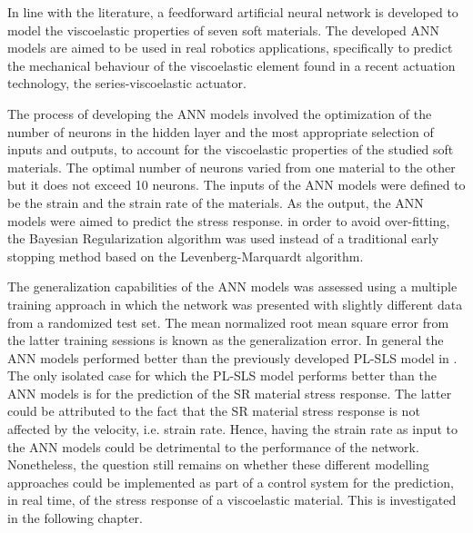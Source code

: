 In line with the literature, a feedforward artificial neural network is developed to model the viscoelastic properties of seven soft materials. The developed ANN models are aimed to be used in real robotics applications, specifically to predict the mechanical behaviour of the viscoelastic element found in a recent actuation technology, the series-viscoelastic actuator.

The process of developing the ANN models involved the optimization of the number of neurons in the hidden layer and the most appropriate selection of inputs and outputs, to account for the viscoelastic properties of the studied soft materials. The optimal number of neurons varied from one material to the other but it does not exceed 10 neurons. The inputs of the ANN models were defined to be the strain and the strain rate of the materials. As the output, the ANN models were aimed to predict the stress response. in order to avoid over-fitting, the Bayesian Regularization algorithm was used instead of a traditional early stopping method based on the Levenberg-Marquardt algorithm.

The generalization capabilities of the ANN models was assessed using a multiple training approach in which the network was presented with slightly different data from a randomized test set. The mean normalized root mean square error from the latter training sessions is known as the generalization error. In general the ANN models performed better than the previously developed PL-SLS model in . The only isolated case for which the PL-SLS model performs better than the ANN models is for the prediction of the SR material stress response. The latter could be attributed to the fact that the SR material stress response is not affected by the velocity, i.e. strain rate. Hence, having the strain rate as input to the ANN models could be detrimental to the performance of the network. Nonetheless, the question still remains on whether these different modelling approaches could be implemented as part of a control system for the prediction, in real time, of the stress response of a viscoelastic material. This is investigated in the following chapter.